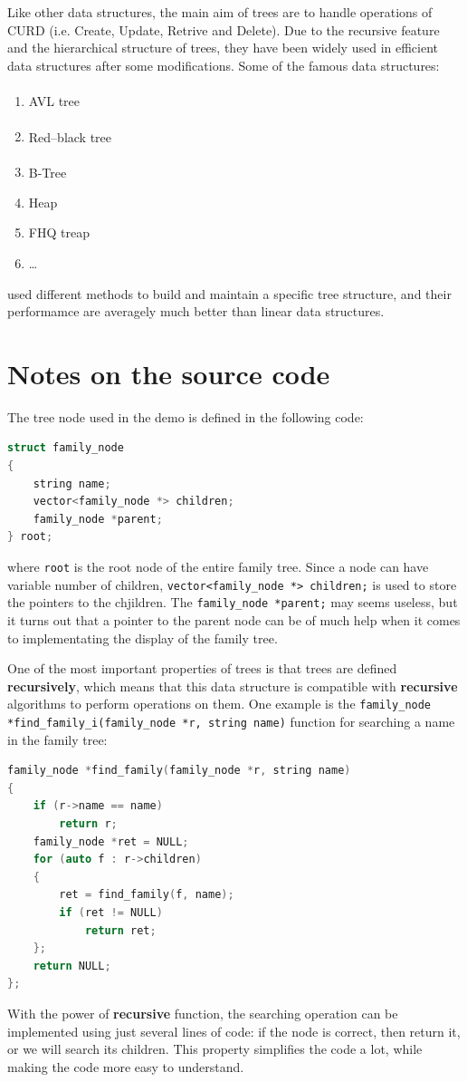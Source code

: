 \documentclass[cn,black,12pt,normal]{elegantnote}
\newcommand{\uct}[1]{\textsuperscript{\textsuperscript{\cite{#1}}}}
\begin{document}
Like other data structures, the main aim of trees are to handle operations of CURD (i.e. Create, Update, Retrive and Delete). Due to the recursive feature and the hierarchical structure of trees, they have been widely used in efficient data structures after some modifications. Some of the famous data structures:
\begin{enumerate}
    \item AVL tree\uct{sedgewick1983balanced}
    \item Red–black tree\uct{bayer1972symmetric}
    \item B-Tree\uct{luo2011organization}
    \item Heap
    \item FHQ treap
    \item \dots
\end{enumerate}
used different methods to build and maintain a specific tree structure, and their performamce are averagely much better than linear data structures.

\section{Notes on the source code}

The tree node used in the demo is defined in the following code:
\begin{lstlisting}[language = C++]
struct family_node
{
	string name;
	vector<family_node *> children;
	family_node *parent;
} root;
\end{lstlisting}
where \lstinline{root} is the root node of the entire family tree. Since a node can have variable number of children, \lstinline{vector<family_node *> children;} is used to store the pointers to the chjildren. The \lstinline{family_node *parent;} may seems useless, but it turns out that a pointer to the parent node can be of much help when it comes to implementating the display of the family tree. 

One of the most important properties of trees is that trees are defined \textbf{recursively}, which means that this data structure is compatible with \textbf{recursive} algorithms to perform operations on them. One example is the \lstinline{family_node *find_family_i(family_node *r, string name)} function for searching a name in the family tree: 
\begin{lstlisting}[language = C++]
family_node *find_family(family_node *r, string name)
{
	if (r->name == name)
		return r;
	family_node *ret = NULL;
	for (auto f : r->children)
	{
		ret = find_family(f, name);
		if (ret != NULL)
			return ret;
	};
	return NULL;
};
\end{lstlisting}
With the power of \textbf{recursive} function, the searching operation can be implemented using just several lines of code: if the node is correct, then return it, or we will search its children. This property simplifies the code a lot, while making the code more easy to understand.
\end{document}
